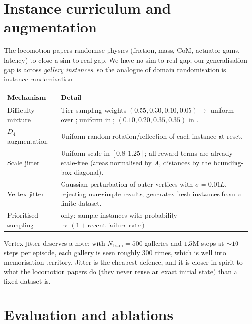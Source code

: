 \documentclass[11pt,a4paper]{article}
\begin{document}
\section{Instance curriculum and augmentation}\label{sec:instances}

The locomotion papers randomise physics (friction, mass, CoM, actuator gains, latency) to
close a sim-to-real gap. We have no sim-to-real gap; our generalisation gap is across
\emph{gallery instances}, so the analogue of domain randomisation is instance randomisation.

\begin{center}
\small
\begin{tabularx}{\linewidth}{@{}l X@{}}
\toprule
\textbf{Mechanism} & \textbf{Detail} \\
\midrule
Difficulty mixture & Tier sampling weights $(0.55,0.30,0.10,0.05) \to$ uniform over \stageI{}; uniform in \stageII{}; $(0.10,0.20,0.35,0.35)$ in \stageIII{}. \\
$D_4$ augmentation & Uniform random rotation/reflection of each instance at reset. \\
Scale jitter       & Uniform scale in $[0.8,1.25]$; all reward terms are already scale-free (areas normalised by $A$, distances by the bounding-box diagonal). \\
Vertex jitter      & Gaussian perturbation of outer vertices with $\sigma = 0.01 L$, rejecting non-simple results; generates fresh instances from a finite dataset. \\
Prioritised sampling & \stageIII{} only: sample instances with probability $\propto (1 + \text{recent failure rate})$. \\
\bottomrule
\end{tabularx}
\end{center}

Vertex jitter deserves a note: with $N_{\mathrm{train}} = 500$ galleries and $1.5$M steps at
$\sim\!10$ steps per episode, each gallery is seen roughly $300$ times, which is well into
memorisation territory. Jitter is the cheapest defence, and it is closer in spirit to what
the locomotion papers do (they never reuse an exact initial state) than a fixed dataset is.

\section{Evaluation and ablations}
\end{document}
